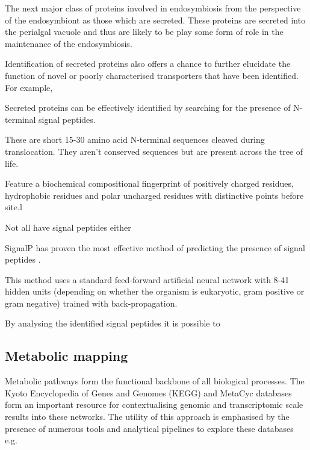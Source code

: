 The next major class of proteins involved in endosymbiosis
from the perspective of the endosymbiont as those
which are secreted.   These proteins are secreted
into the perialgal vacuole and thus are likely to
be play some form of role in the maintenance of
the endosymbiosis.


Identification of secreted proteins also offers
a chance to further elucidate the function of novel or poorly 
characterised transporters that have been identified. 
For example, 

Secreted proteins can be effectively identified by 
searching for the presence of N-terminal signal peptides. 

These are short 15-30 amino acid N-terminal sequences cleaved during translocation.
They aren't conserved sequences but are present across the tree of life.

Feature a biochemical compositional fingerprint 
of positively charged residues, hydrophobic residues and polar uncharged
residues with distinctive points before site.l \citep{Emanuelsson2007}





Not all have signal peptides either





SignalP \citep{Nielsen1997} has proven the most effective method of predicting
the presence of signal peptides \citep{Lee2009a,Petersen2011}.


This method uses a standard feed-forward artificial neural network
with 8-41 hidden units (depending on whether the organism is eukaryotic, 
gram positive or gram negative) trained with back-propagation.




By analysing the identified signal peptides it is possible
to 

\subsection{Metabolic mapping}

Metabolic pathways form the functional backbone of all biological processes. 
The Kyoto Encyclopedia of Genes and Genomes (KEGG) \citep{Ogata1999,Okuda2008,Kanehisa2014} 
and MetaCyc \citep{Caspi2007} databases form an important resource for contextualising
genomic and transcriptomic scale results into these networks. 
The utility of this approach is emphasised by the presence of numerous
tools and analytical pipelines to explore these databases 
e.g. \citep{Okuda2008,Nakao1999,Karp2002,Karp2010,Antonov2008,Klukas2007}


